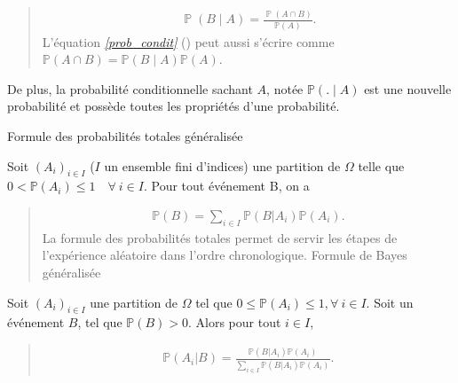 \documentclass[letterpaper,11pt,english]{sphinxmanual}
\begin{document}
\begin{DUlineblock}{0em}
\item[] 
\end{DUlineblock}
\begin{quote}
\begin{equation}\label{equation:chapter2:chapter2:35}
\begin{split}\operatorname{\mathbb{P}}(B \mid A)=\frac{\operatorname{\mathbb{P}}(A \cap B)}{\mathbb{P}(A)}.\end{split}
\end{equation}
\sphinxAtStartPar
L’équation {\hyperref[\detokenize{chapter2:prob_condit}]{\emph{{[}prob\_condit{]}}}} () peut aussi s’écrire
comme \(\mathbb{P}(A \cap B)=\mathbb{P}(B \mid A) \mathbb{P}(A)\).
\end{quote}

\begin{DUlineblock}{0em}
\item[] De plus, la probabilité conditionnelle sachant \(A\), notée
\(\mathbb{P}(. \mid A)\) est une nouvelle probabilité et possède
toutes les propriétés d’une probabilité.
\end{DUlineblock}

\begin{DUlineblock}{0em}
\item[]  Formule des probabilités totales généralisée
\item[] Soit \((A_i)_{i\in I}\) (\(I\) un ensemble fini d’indices) une
partition de \(\Omega\) telle que
\(0 < \mathbb{P}(A_i)\leq 1 \quad\forall\  i\in I.\) Pour tout
événement B, on a
\end{DUlineblock}
\begin{quote}
\begin{equation}\label{equation:chapter2:chapter2:36}
\begin{split}\mathbb{P}(B)=\sum_{i \in I} \mathbb{P}\left(B|A_{i}\right)\mathbb{P}\left(A_{i}\right).\end{split}
\end{equation}
\sphinxAtStartPar
La formule des probabilités totales permet de servir les étapes de
l’expérience aléatoire dans l’ordre chronologique. 
Formule de Bayes généralisée
\end{quote}

\begin{DUlineblock}{0em}
\item[] Soit \((A_i)_{i\in I}\) une partition de \(\Omega\) tel que
\(0\leq \mathbb{P}(A_{i})\leq 1,\forall\  i\in I\). Soit un
événement \(B\), tel que \(\mathbb{P}(B)>0\). Alors pour tout
\(i\in I\),
\end{DUlineblock}
\begin{quote}
\begin{equation}\label{equation:chapter2:chapter2:37}
\begin{split}\mathbb{P}(A_{i}|B)=\frac{ \mathbb{P}\left(B|A_{i}\right)\mathbb{P}\left(A_{i}\right)}{\sum_{i \in I} \mathbb{P}\left(B|A_{i}\right)\mathbb{P}\left(A_{i}\right)}.\end{split}
\end{equation}\end{quote}
\end{document}

